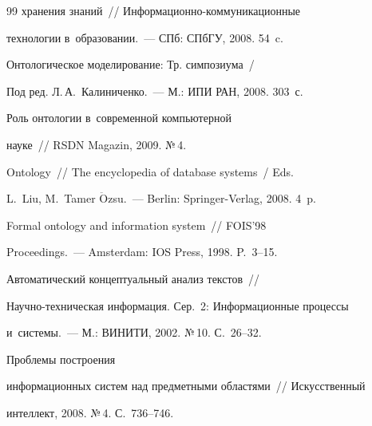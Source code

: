 {{\begin{thebibliography}{99}
хранения знаний~/\!\!/ Ин\-фор\-ма\-ци\-он\-но-ком\-му\-ни\-ка\-ци\-он\-ные 


технологии в~образовании.~--- СПб: СПбГУ, 2008. 54~c.




  Онтологическое моделирование: Тр. симпозиума~/ 


  Под ред. Л.\,А.~Калиниченко.~--- М.: ИПИ РАН, 2008. 303~с. 




   Роль онтологии в~современной компьютерной 


науке~/\!\!/ RSDN Magazin, 2009. №\,4. 




   Ontology~/\!\!/ The encyclopedia of database systems~/ Eds. 


L.~Liu, M.~Tamer $\ddot{\mbox{O}}$zsu.~--- Berlin: Springer-Verlag, 2008. 4~p.




   Formal ontology and information system~/\!\!/ FOIS'98 


Proceedings.~--- Amsterdam: IOS Press, 1998. P.~3--15.




   Автоматический концептуальный анализ текстов~/\!\!/ 


На\-уч\-но-тех\-ни\-че\-ская информация. Сер.~2: Информационные процессы 


и~системы.~--- М.: ВИНИТИ, 2002. №\,10. С.~26--32.




   Проблемы построения 


информационных систем над предметными областями~/\!\!/ Искусственный 


интеллект, 2008. №\,4. С.~736--746.


   \end{thebibliography}


} }








\vspace*{-9pt}





